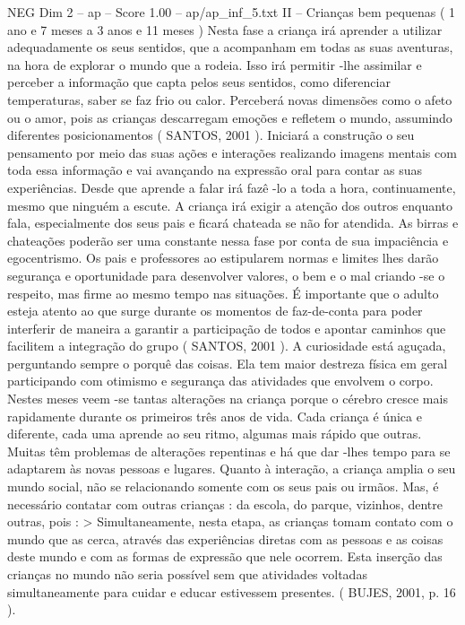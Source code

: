 \begin{textsample}{NEG Dim 2 – ap – Score 1.00 – ap/ap\_inf\_5.txt}  \label{ex:f2_neg_146}
II – Crianças bem pequenas ( 1 ano e 7 meses a 3 anos e 11 meses ) Nesta fase a criança irá aprender a utilizar adequadamente os seus sentidos, que a acompanham em todas as suas aventuras, na hora de explorar o mundo que a rodeia.
Isso irá permitir -lhe assimilar e perceber a informação que capta pelos seus sentidos, como diferenciar temperaturas, saber se faz frio ou calor.
Perceberá novas dimensões como o afeto ou o amor, pois as crianças descarregam emoções e refletem o mundo, assumindo diferentes posicionamentos ( SANTOS, 2001 ).
Iniciará a construção o seu pensamento por meio das suas ações e interações realizando imagens mentais com toda essa informação e vai avançando na expressão oral para contar as suas experiências.
Desde que aprende a falar irá fazê -lo a toda a hora, continuamente, mesmo que ninguém a escute.
A criança irá exigir a atenção dos outros enquanto fala, especialmente dos seus pais e ficará chateada se não for atendida.
As birras e chateações poderão ser uma constante nessa fase por conta de sua impaciência e egocentrismo.
Os pais e professores ao estipularem normas e limites lhes darão segurança e oportunidade para desenvolver valores, o bem e o mal criando -se o respeito, mas firme ao mesmo tempo nas situações.
É importante que o adulto esteja atento ao que surge durante os momentos de faz-de-conta para poder interferir de maneira a garantir a participação de todos e apontar caminhos que facilitem a integração do grupo ( SANTOS, 2001 ).
A curiosidade está aguçada, perguntando sempre o porquê das coisas.
Ela tem maior destreza física em geral participando com otimismo e segurança das atividades que envolvem o corpo.
Nestes meses veem -se tantas alterações na criança porque o cérebro cresce mais rapidamente durante os primeiros três anos de vida.
Cada criança é única e diferente, cada uma aprende ao seu ritmo, algumas mais rápido que outras.
Muitas têm problemas de alterações repentinas e há que dar -lhes tempo para se adaptarem às novas pessoas e lugares.
Quanto à interação, a criança amplia o seu mundo social, não se relacionando somente com os seus pais ou irmãos.
Mas, é necessário contatar com outras crianças : da escola, do parque, vizinhos, dentre outras, pois : > Simultaneamente, nesta etapa, as crianças tomam contato com o mundo que as cerca, através das experiências diretas com as pessoas e as coisas deste mundo e com as formas de expressão que nele ocorrem.
Esta inserção das crianças no mundo não seria possível sem que atividades voltadas simultaneamente para cuidar e educar estivessem presentes. ( BUJES, 2001, p. 16 ).

\end{textsample}
